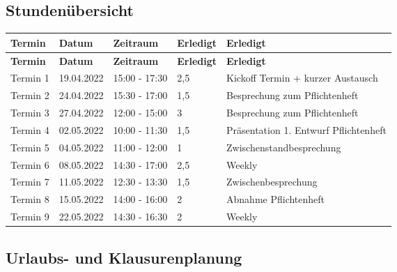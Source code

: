 \subsection{Stundenübersicht}

\begin{flushleft}
		\begin{longtable}{p{2cm}p{2cm}p{3cm}p{2cm}p{8cm}}
            \toprule
            \textbf{Termin} & \textbf{Datum} & \textbf{Zeitraum} & \textbf{Erledigt} & \textbf{Erledigt}\\
            \midrule\endfirsthead
            \toprule
            \textbf{Termin} & \textbf{Datum} & \textbf{Zeitraum} & \textbf{Erledigt} & \textbf{Erledigt}\\
            \midrule\endhead
            	Termin 1 & 19.04.2022 & 15:00 - 17:30 & 2,5 & Kickoff Termin + kurzer Austausch \\ \midrule
				Termin 2 & 24.04.2022 & 15:30 - 17:00 & 1,5 & Besprechung zum Pflichtenheft \\ \midrule
				Termin 3 & 27.04.2022 & 12:00 - 15:00 & 3 & Besprechung zum Pflichtenheft \\ \midrule
				Termin 4 & 02.05.2022 & 10:00 - 11:30 & 1,5 & Präsentation 1. Entwurf Pflichtenheft \\ \midrule
				Termin 5 & 04.05.2022 & 11:00 - 12:00 & 1 & Zwischenstandbesprechung \\ \midrule
				Termin 6 & 08.05.2022 & 14:30 - 17:00 & 2,5 & Weekly\\ \midrule
				Termin 7 & 11.05.2022 & 12:30 - 13:30 & 1,5 & Zwischenbesprechung\\  \midrule
				Termin 8 & 15.05.2022 & 14:00 - 16:00 & 2 & Abnahme Pflichtenheft\\  \midrule
				Termin 9 & 22.05.2022 & 14:30 - 16:30 & 2 & Weekly\\
            \bottomrule
    \end{longtable}
\end{flushleft}

\subsection{Urlaubs- und Klausurenplanung}

